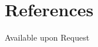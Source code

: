 \documentclass[11pt,a4paper,sans]{moderncv}        %
\begin{document}
\section{References}

Available upon Request








\end{document}

